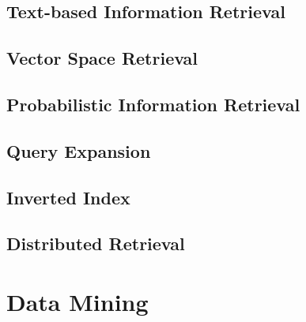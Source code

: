 \documentclass[a4paper]{article}
\begin{document}
  \subsection{Text-based Information Retrieval} %
  \label{sub:text_based_information_retrieval}

  \subsection{Vector Space Retrieval} %
  \label{sub:vector_space_re}

  \subsection{Probabilistic Information Retrieval} %
  \label{sub:probabilistic_information_retrieval}

  \subsection{Query Expansion} %
  \label{sub:query_expansion}

  \subsection{Inverted Index} %
  \label{sub:inverted_index}

  \subsection{Distributed Retrieval} %
  \label{sub:distributed_retrieval}

  

  

\section{Data Mining} %
\label{sec:data_mining}
  
\end{document}
